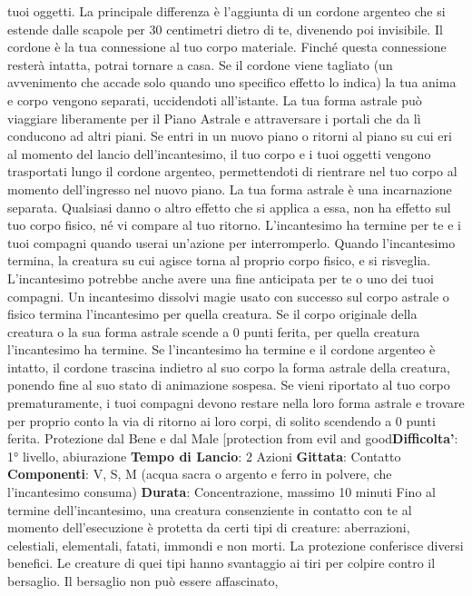 \begin{multicols}{2}
tuoi oggetti. La principale differenza è l’aggiunta di un
cordone argenteo che si estende dalle scapole per 30
centimetri dietro di te, divenendo poi invisibile. Il
cordone è la tua connessione al tuo corpo materiale.
Finché questa connessione resterà intatta, potrai
tornare a casa. Se il cordone viene tagliato (un
avvenimento che accade solo quando uno specifico
effetto lo indica) la tua anima e corpo vengono separati,
uccidendoti all’istante.
La tua forma astrale può viaggiare liberamente per il
Piano Astrale e attraversare i portali che da lì
conducono ad altri piani. Se entri in un nuovo piano o
ritorni al piano su cui eri al momento del lancio
dell’incantesimo, il tuo corpo e i tuoi oggetti vengono
trasportati lungo il cordone argenteo, permettendoti di
rientrare nel tuo corpo al momento dell’ingresso nel
nuovo piano. La tua forma astrale è una incarnazione
separata. Qualsiasi danno o altro effetto che si applica
a essa, non ha effetto sul tuo corpo fisico, né vi
compare al tuo ritorno.
L’incantesimo ha termine per te e i tuoi compagni
quando userai un’azione per interromperlo. Quando
l’incantesimo termina, la creatura su cui agisce torna al
proprio corpo fisico, e si risveglia.
L’incantesimo potrebbe anche avere una fine anticipata
per te o uno dei tuoi compagni. Un incantesimo dissolvi
magie usato con successo sul corpo astrale o fisico
termina l’incantesimo per quella creatura. Se il corpo
originale della creatura o la sua forma astrale scende a
0 punti ferita, per quella creatura l’incantesimo ha
termine. Se l’incantesimo ha termine e il cordone
argenteo è intatto, il cordone trascina indietro al suo
corpo la forma astrale della creatura, ponendo fine al
suo stato di animazione sospesa.
Se vieni riportato al tuo corpo prematuramente, i tuoi
compagni devono restare nella loro forma astrale e
trovare per proprio conto la via di ritorno ai loro corpi, di
solito scendendo a 0 punti ferita.
Protezione dal Bene e dal Male
[protection from evil and good\textbf{Difficolta'}:
1° livello, abiurazione
\textbf{Tempo di Lancio}: 2 Azioni
\textbf{Gittata}: Contatto
\textbf{Componenti}: V, S, M (acqua sacra o argento e ferro in
polvere, che l’incantesimo consuma)
\textbf{Durata}: Concentrazione, massimo 10 minuti
Fino al termine dell’incantesimo, una creatura
consenziente in contatto con te al momento
dell’esecuzione è protetta da certi tipi di creature:
aberrazioni, celestiali, elementali, fatati, immondi e non
morti.
La protezione conferisce diversi benefici. Le creature di
quei tipi hanno svantaggio ai tiri per colpire contro il
bersaglio. Il bersaglio non può essere affascinato,

\end{multicols}
